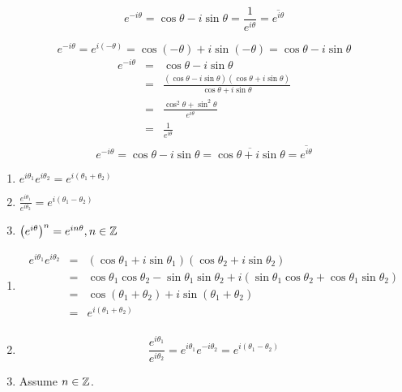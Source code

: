 \documentclass[letterpaper,12pt,fleqn]{article}
\renewcommand{\o}{\theta}
\newcommand{\conj}[1]{\overline{#1}}
\begin{document}
\begin{corollary}
\[e^{-i\o}=\cos\o-i\sin\o=\frac{1}{e^{i\o}}=\conj{e^{i\o}}\]
\end{corollary}

\begin{theproof}
\[e^{-i\o}=e^{i(-\o)}=\cos{(-\o)}+i\sin{(-\o)}=\cos\o-i\sin\o\]
\begin{eqnarray*}
e^{-i\o} &=& \cos\o-i\sin\o \\
    &=& \frac{(\cos\o-i\sin\o)(\cos\o+i\sin\o)}{\cos\o+i\sin\o} \\
    &=& \frac{\cos^2\o+\sin^2\o}{e^{i\o}} \\
    &=& \frac{1}{e^{i\o}} \\
\end{eqnarray*}
\[e^{-i\o}=\cos\o-i\sin\o=\conj{\cos\o+i\sin\o}=\conj{e^{i\o}}\]
\end{theproof}

\begin{theorem}
\listbreak
\begin{enumerate}
\item $e^{i\o_1}e^{i\o_2}=e^{i(\o_1+\o_2)}$
\item $\frac{e^{i\o_1}}{e^{i\o_2}}=e^{i(\o_1-\o_2)}$
\item $\left(e^{i\o}\right)^n=e^{in\o},n\in\Z$
\end{enumerate}
\end{theorem}

\begin{theproof}
\listbreak
\begin{enumerate}
\item
\begin{eqnarray*}
e^{i\o_1}e^{i\o_2} &=& (\cos\o_1+i\sin\o_1)(\cos\o_2+i\sin\o_2) \\
    &=& \cos\o_1\cos\o_2-\sin\o_1\sin\o_2
        +i(\sin\o_1\cos\o_2+\cos\o_1\sin\o_2) \\
    &=& \cos(\o_1+\o_2)+i\sin(\o_1+\o_2) \\
    &=& e^{i(\o_1+\o_2)} \\
\end{eqnarray*}

\item
\[\frac{e^{i\o_1}}{e^{i\o_2}}=e^{i\o_1}e^{-i\o_2}=e^{i(\o_1-\o_2)}\]

\item
Assume $n\in\mathbb{Z}$.
\end{enumerate}
\end{theproof}
\end{document}

